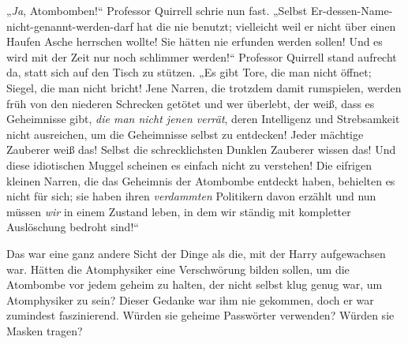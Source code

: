 „\emph{Ja}, Atombomben!“ Professor Quirrell schrie nun fast. „Selbst Er-dessen-Name-nicht-genannt-werden-darf hat die nie benutzt; vielleicht weil er nicht über einen Haufen Asche herrschen wollte! Sie hätten nie erfunden werden sollen! Und es wird mit der Zeit nur noch schlimmer werden!“ Professor Quirrell stand aufrecht da, statt sich auf den Tisch zu stützen. „Es gibt Tore, die man nicht öffnet; Siegel, die man nicht bricht! Jene Narren, die trotzdem damit rumspielen, werden früh von den niederen Schrecken getötet und wer überlebt, der weiß, dass es Geheimnisse gibt, \emph{die man nicht jenen verrät}, deren Intelligenz und Strebsamkeit nicht ausreichen, um die Geheimnisse selbst zu entdecken! Jeder mächtige Zauberer weiß das! Selbst die schrecklichsten Dunklen Zauberer wissen das! Und diese idiotischen Muggel scheinen es einfach nicht zu verstehen! Die eifrigen kleinen Narren, die das Geheimnis der Atombombe entdeckt haben, behielten es nicht für sich; sie haben ihren \emph{verdammten} Politikern davon erzählt und nun müssen \emph{wir} in einem Zustand leben, in dem wir ständig mit kompletter Auslöschung bedroht sind!“

Das war eine ganz andere Sicht der Dinge als die, mit der Harry aufgewachsen war. Hätten die Atomphysiker eine Verschwörung bilden sollen, um die Atombombe vor jedem geheim zu halten, der nicht selbst klug genug war, um Atomphysiker zu sein? Dieser Gedanke war ihm nie gekommen, doch er war zumindest faszinierend. Würden sie geheime Passwörter verwenden? Würden sie Masken tragen?

